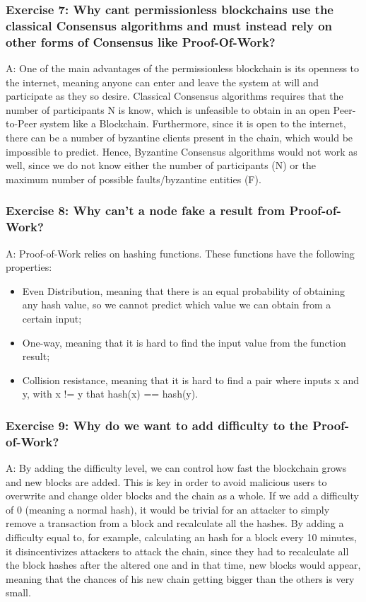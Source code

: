 \documentclass[12pt,a4paper]{article}
\begin{document}

\subsubsection*{Exercise 7: Why cant permissionless blockchains use the classical Consensus algorithms and must instead rely on other forms of Consensus like Proof-Of-Work?}

A: One of the main advantages of the permissionless blockchain is its openness to the internet, meaning anyone can enter and leave the system at will and participate as they so desire. Classical Consensus algorithms requires that the number of participants N is know, which is unfeasible to obtain in an open Peer-to-Peer system like a Blockchain. Furthermore, since it is open to the internet, there can be a number of byzantine clients present in the chain, which would be impossible to predict. Hence, Byzantine Consensus algorithms would not work as well, since we do not know either the number of participants (N) or the maximum number of possible faults/byzantine entities (F).

\subsubsection*{Exercise 8: Why can't a node fake a result from Proof-of-Work?}

A: Proof-of-Work relies on hashing functions. These functions have the following properties:
\begin{itemize}
    \item Even Distribution, meaning that there is an equal probability of obtaining any hash value, so we cannot predict which value we can obtain from a certain input;
    \item One-way, meaning that it is hard to find the input value from the function result;
    \item Collision resistance, meaning that it is hard to find a pair where inputs x and y, with x != y that hash(x) == hash(y).
\end{itemize}

\subsubsection*{Exercise 9: Why do we want to add difficulty to the Proof-of-Work?}
A: By adding the difficulty level, we can control how fast the blockchain grows and new blocks are added. This is key in order to avoid malicious users to overwrite and change older blocks and the chain as a whole. If we add a difficulty of 0 (meaning a normal hash), it would be trivial for an attacker to simply remove a transaction from a block and recalculate all the hashes. By adding a difficulty equal to, for example, calculating an hash for a block every 10 minutes, it disincentivizes attackers to attack the chain, since they had to recalculate all the block hashes after the altered one and in that time, new blocks would appear, meaning that the chances of his new chain getting bigger than the others is very small.
\end{document}
